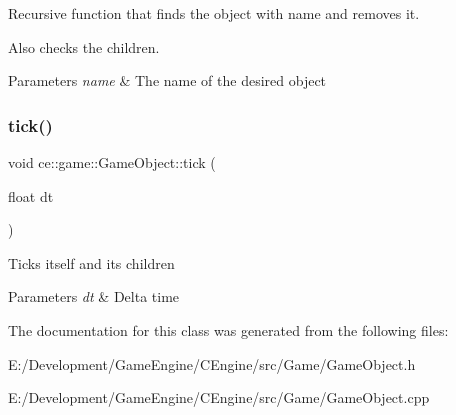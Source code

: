 Recursive function that finds the object with name and removes it. 

Also checks the children.


\begin{DoxyParams}{Parameters}
{\em name} & The name of the desired object \\
\hline
\end{DoxyParams}
\mbox{\label{classce_1_1game_1_1_game_object_aa77b42484f1a5c0abf1d4bf1564becac}} 
\subsubsection{\texorpdfstring{tick()}{tick()}}
{\footnotesize\ttfamily void ce\+::game\+::\+Game\+Object\+::tick (\begin{DoxyParamCaption}\item[{float}]{dt }\end{DoxyParamCaption})}

Ticks itself and its children


\begin{DoxyParams}{Parameters}
{\em dt} & Delta time \\
\hline
\end{DoxyParams}


The documentation for this class was generated from the following files\+:\begin{DoxyCompactItemize}
\item 
E\+:/\+Development/\+Game\+Engine/\+C\+Engine/src/\+Game/Game\+Object.\+h\item 
E\+:/\+Development/\+Game\+Engine/\+C\+Engine/src/\+Game/Game\+Object.\+cpp\end{DoxyCompactItemize}
